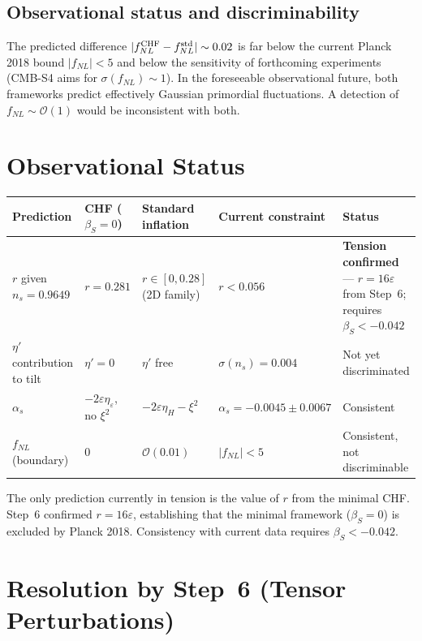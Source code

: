 \documentclass[12pt,a4paper]{article}
\begin{document}
\subsection{Observational status and discriminability}

The predicted difference $|f_{NL}^{\rm CHF} - f_{NL}^{\rm std}| \sim 0.02$ is far below the current Planck 2018 bound $|f_{NL}| < 5$ and below the sensitivity of forthcoming experiments (CMB-S4 aims for $\sigma(f_{NL}) \sim 1$). In the foreseeable observational future, both frameworks predict effectively Gaussian primordial fluctuations. A detection of $f_{NL} \sim \mathcal{O}(1)$ would be inconsistent with both.

\section{Observational Status}

\begin{table}[h]
\centering
\small
\begin{tabular}{@{}lp{2.8cm}p{2.8cm}p{2.6cm}p{3cm}@{}}
\toprule
Prediction & CHF ($\beta_S=0$) & Standard inflation & Current constraint & Status \\
\midrule
$r$ given $n_s = 0.9649$ & $r = 0.281$ & $r \in [0, 0.28]$ (2D family) & $r < 0.056$ & \textbf{Tension confirmed} --- $r = 16\varepsilon$ from Step~6; requires $\beta_S < -0.042$ \\[4pt]
$\eta'$ contribution to tilt & $\eta' = 0$ & $\eta'$ free & $\sigma(n_s) = 0.004$ & Not yet discriminated \\[4pt]
$\alpha_s$ & $-2\varepsilon\eta_\varepsilon$, no $\xi^2$ & $-2\varepsilon\eta_H - \xi^2$ & $\alpha_s = -0.0045 \pm 0.0067$ & Consistent \\[4pt]
$f_{NL}$ (boundary) & $0$ & $\mathcal{O}(0.01)$ & $|f_{NL}| < 5$ & Consistent, not discriminable \\
\bottomrule
\end{tabular}
\end{table}

The only prediction currently in tension is the value of $r$ from the minimal CHF. Step~6 confirmed $r = 16\varepsilon$, establishing that the minimal framework ($\beta_S = 0$) is excluded by Planck 2018. Consistency with current data requires $\beta_S < -0.042$.

\section{Resolution by Step~6 (Tensor Perturbations)}
\end{document}
